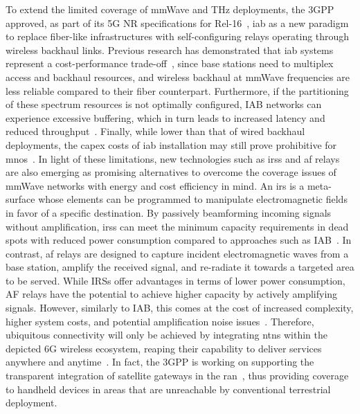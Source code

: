 To extend the limited coverage of mmWave and THz deployments, the 3GPP approved, as part of its 5G NR specifications for Rel-16~\cite{3gpp_38_874}, \gls{iab} as a new paradigm to replace fiber-like infrastructures with self-configuring relays operating through wireless backhaul links.
Previous research has demonstrated that \gls{iab} systems represent a cost-performance trade-off~\cite{polese2020integrated}, since base stations need to multiplex access and backhaul resources, and wireless backhaul at mmWave frequencies are less reliable compared to their fiber counterpart.
Furthermore, if the partitioning of these spectrum resources is not optimally configured, IAB networks can experience excessive buffering, which in turn leads to increased latency and reduced throughput~\cite{8514996}. Finally, while lower than that of wired backhaul deployments, the \gls{capex} costs of \gls{iab} installation may still prove prohibitive for \glspl{mno}~\cite{chaoub20216g}.
In light of these limitations, new technologies such as \glspl{irs} and \gls{af} relays are also emerging as promising alternatives to overcome the coverage issues of mmWave networks with energy and cost efficiency in mind.
An \gls{irs} is a meta-surface whose elements can be programmed to manipulate electromagnetic fields in favor of a specific destination. By passively beamforming incoming signals without amplification, \glspl{irs} can meet the minimum capacity requirements in dead spots with reduced power consumption compared to approaches such as IAB~\cite{bjornson2019intelligent}. In contrast, \gls{af} relays are designed to capture incident electromagnetic waves from a base station, amplify the received signal, and re-radiate it towards a targeted area to be served.
While IRSs offer advantages in terms of lower power consumption, AF relays have the potential to achieve higher capacity by actively amplifying signals. However, similarly to IAB, this comes at the cost of increased complexity, higher system costs, and potential amplification noise issues~\cite{huang2019reconfigurable}.
Therefore, ubiquitous connectivity will only be achieved by integrating \glspl{ntn} within the depicted 6G wireless ecosystem, reaping their capability to deliver services anywhere and anytime~\cite{8766143}. In fact, the 3GPP is working on supporting the transparent integration of satellite gateways in the \gls{ran}~\cite{38821}, thus providing coverage to handheld devices in areas that are unreachable by conventional terrestrial deployment.

